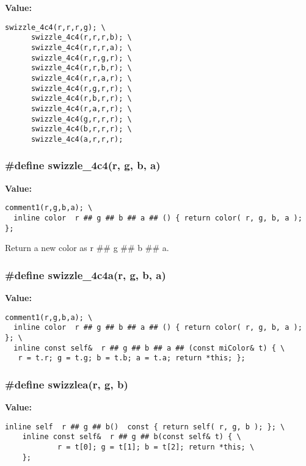 {\bf Value:}

\footnotesize\begin{verbatim}swizzle_4c4(r,r,r,g); \
      swizzle_4c4(r,r,r,b); \
      swizzle_4c4(r,r,r,a); \
      swizzle_4c4(r,r,g,r); \
      swizzle_4c4(r,r,b,r); \
      swizzle_4c4(r,r,a,r); \
      swizzle_4c4(r,g,r,r); \
      swizzle_4c4(r,b,r,r); \
      swizzle_4c4(r,a,r,r); \
      swizzle_4c4(g,r,r,r); \
      swizzle_4c4(b,r,r,r); \
      swizzle_4c4(a,r,r,r);
\end{verbatim}\normalsize 
{}
\subsubsection{\setlength{\rightskip}{0pt plus 5cm}\#define swizzle\_\-4c4(r, g, b, a)}\label{mrSwizzle_8h_a6}


{\bf Value:}

\footnotesize\begin{verbatim}comment1(r,g,b,a); \
  inline color  r ## g ## b ## a ## () { return color( r, g, b, a ); };
\end{verbatim}\normalsize 
Return a new color as r \#\# g \#\# b \#\# a. 

\subsubsection{\setlength{\rightskip}{0pt plus 5cm}\#define swizzle\_\-4c4a(r, g, b, a)}\label{mrSwizzle_8h_a7}


{\bf Value:}

\footnotesize\begin{verbatim}comment1(r,g,b,a); \
  inline color  r ## g ## b ## a ## () { return color( r, g, b, a ); }; \
  inline const self&  r ## g ## b ## a ## (const miColor& t) { \
   r = t.r; g = t.g; b = t.b; a = t.a; return *this; };
\end{verbatim}\normalsize 
{}
\subsubsection{\setlength{\rightskip}{0pt plus 5cm}\#define swizzlea(r, g, b)}\label{mrSwizzle_8h_a1}


{\bf Value:}

\footnotesize\begin{verbatim}inline self  r ## g ## b()  const { return self( r, g, b ); }; \
    inline const self&  r ## g ## b(const self& t) { \
            r = t[0]; g = t[1]; b = t[2]; return *this; \
    };
\end{verbatim}\normalsize 
